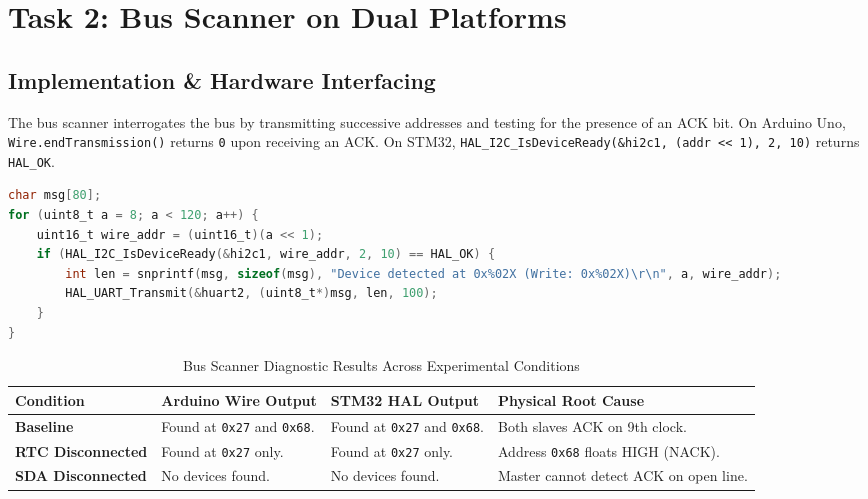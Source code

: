 \documentclass[11pt,a4paper,oneside]{report}
\begin{document}
\chapter{Task 2: Bus Scanner on Dual Platforms}

\section{Implementation \& Hardware Interfacing}
The bus scanner interrogates the bus by transmitting successive addresses and testing for the presence of an ACK bit. On Arduino Uno, \texttt{Wire.endTransmission()} returns \texttt{0} upon receiving an ACK. On STM32, \texttt{HAL\_I2C\_IsDeviceReady(\&hi2c1, (addr <{}< 1), 2, 10)} returns \texttt{HAL\_OK}.

\begin{lstlisting}[language=C, caption={STM32 HAL I2C Bus Scanner Routine}]
char msg[80];
for (uint8_t a = 8; a < 120; a++) {
    uint16_t wire_addr = (uint16_t)(a << 1);
    if (HAL_I2C_IsDeviceReady(&hi2c1, wire_addr, 2, 10) == HAL_OK) {
        int len = snprintf(msg, sizeof(msg), "Device detected at 0x%02X (Write: 0x%02X)\r\n", a, wire_addr);
        HAL_UART_Transmit(&huart2, (uint8_t*)msg, len, 100);
    }
}
\end{lstlisting}

\begin{table}[h!]
\centering
\small
\caption{Bus Scanner Diagnostic Results Across Experimental Conditions}
\vspace{4pt}
\begin{tabularx}{\textwidth}{l p{4.2cm} p{4.5cm} X}
\toprule
\textbf{Condition} & \textbf{Arduino Wire Output} & \textbf{STM32 HAL Output} & \textbf{Physical Root Cause} \\
\midrule
\textbf{Baseline} & Found at \texttt{0x27} and \texttt{0x68}. & Found at \texttt{0x27} and \texttt{0x68}. & Both slaves ACK on 9th clock. \\
\textbf{RTC Disconnected} & Found at \texttt{0x27} only. & Found at \texttt{0x27} only. & Address \texttt{0x68} floats HIGH (NACK). \\
\textbf{SDA Disconnected} & No devices found. & No devices found. & Master cannot detect ACK on open line. \\
\bottomrule
\end{tabularx}
\end{table}
\end{document}
